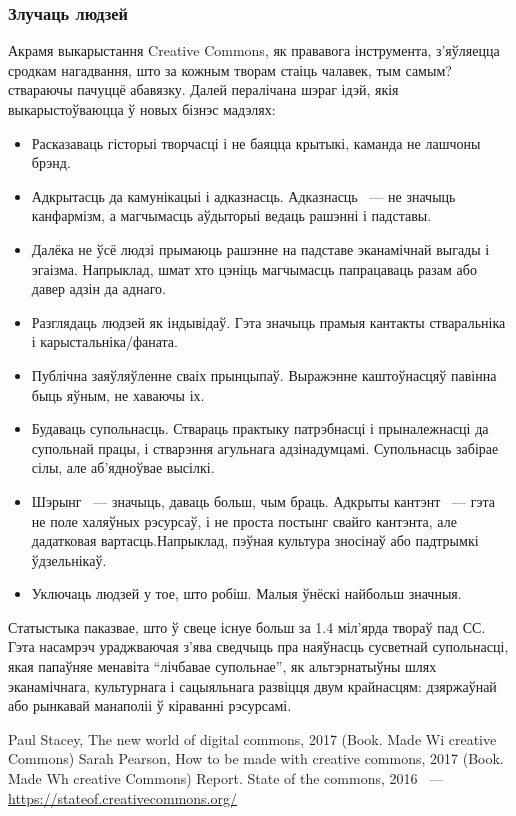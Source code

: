 \documentclass[10pt, a5paper]{article}
\begin{document}
\subsubsection*{Злучаць людзей}

Акрамя выкарыстання Creative Commons, як прававога інструмента, з’яўляецца сродкам нагадвання, што за кожным творам стаіць чалавек, тым самым? ствараючы пачуццё абавязку. Далей пералічана шэраг ідэй, якія выкарыстоўваюцца ў новых бізнэс мадэлях:

\begin{itemize}
  \item Расказаваць гісторыі творчасці і не баяцца крытыкі, каманда не лашчоны брэнд.
  \item Адкрытасць да камунікацыі і адказнасць. Адказнасць ~--- не значыць канфармізм, а магчымасць аўдыторыі ведаць рашэнні і падставы.
  \item Далёка не ўсё людзі прымаюць рашэнне на падставе эканамічнай выгады і эгаізма. Напрыклад, шмат хто цэніць магчымасць папрацаваць разам або давер адзін да аднаго.
  \item Разглядаць людзей як індывідаў. Гэта значыць прамыя кантакты стваральніка і карыстальніка/фаната.
  \item Публічна заяўляўленне сваіх прынцыпаў. Выражэнне каштоўнасцяў павінна быць яўным, не хаваючы іх.
  \item Будаваць супольнасць. Ствараць практыку патрэбнасці і прыналежнасці да супольнай працы, і стварэння агульнага адзінадумцамі. Супольнасць забірае сілы, але аб’ядноўвае высілкі.
  \item Шэрынг ~--- значыць, даваць больш, чым браць. Адкрыты кантэнт ~--- гэта не поле халяўных рэсурсаў, і не проста постынг свайго кантэнта, але дадатковая вартасць.Напрыклад, пэўная культура зносінаў або падтрымкі ўдзельнікаў.
  \item Уключаць людзей у тое, што робіш. Малыя ўнёскі найбольш значныя.
\end{itemize}

Статыстыка паказвае, што ў свеце існуе больш за 1.4 міл’ярда твораў пад СС. Гэта насамрэч ураджваючая з’ява сведчыць пра наяўнасць сусветнай супольнасці, якая папаўняе менавіта “лічбавае супольнае”, як альтэрнатыўны шлях эканамічнага, культурнага і сацыяльнага развіцця двум крайнасцям: дзяржаўнай або рынкавай манаполіі ў кіраванні рэсурсамі.

\begin{thebibliography}{99}

 Paul Stacey, The new world of digital commons, 2017 (Book. Made Wi creative Commons)
 Sarah Pearson, How to be made with creative commons, 2017 (Book. Made Wh creative Commons)
  Report. State of the commons, 2016 ~--- \url{https://stateof.creativecommons.org/}
\end{thebibliography}
\end{document}

